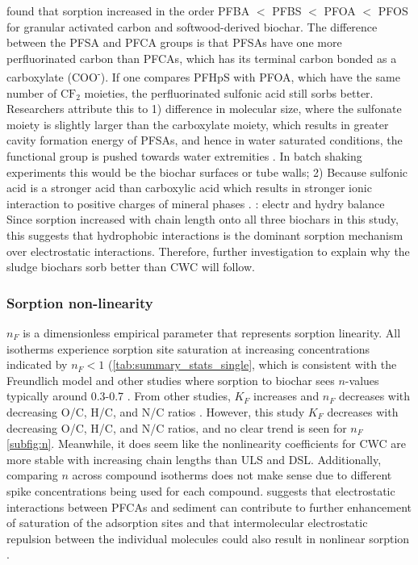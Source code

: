 \cite{zhang2021sorption} found that sorption increased in the order PFBA $<$ PFBS $<$ PFOA $<$ PFOS for granular activated carbon and softwood-derived biochar. The difference between the PFSA and PFCA groups is that PFSAs have one more perfluorinated carbon than PFCAs, which has its terminal carbon bonded as a carboxylate (COO\textsuperscript{-}). If one compares PFHpS with PFOA, which have the same number of $\mathrm{CF_2}$ moieties, the perfluorinated sulfonic acid still sorbs better. Researchers attribute this to 1) difference in molecular size, where the sulfonate moiety is slightly larger than the carboxylate moiety, which results in greater cavity formation energy of PFSAs, and hence in water saturated conditions, the functional group is pushed towards water extremities \citep{yin2022insights,sigmund2022sorption}. In batch shaking experiments this would be the biochar surfaces or tube walls; 2) Because sulfonic acid is a stronger acid than carboxylic acid which results in stronger ionic interaction to positive charges of mineral phases \citep{arvaniti2015review}. \cite{du2014adsorption}: electr and hydry balance Since sorption increased with chain length onto all three biochars in this study, this suggests that hydrophobic interactions is the dominant sorption mechanism over electrostatic interactions. Therefore, further investigation to explain why the sludge biochars sorb better than CWC will follow. 

\subsubsection{Sorption non-linearity}
$n_F$ is a dimensionless empirical parameter that represents sorption linearity. All isotherms experience sorption site saturation at increasing concentrations indicated by $n_F<1 $ (\cref{tab:summary_stats_single}, which is consistent with the Freundlich model and other studies where sorption to biochar sees $n$-values typically around 0.3-0.7 \citep{Cornelissen2005}. From other studies, $K_F$ increases and $n_F$ decreases with decreasing O/C, H/C, and N/C ratios \citep{Cornelissen2005}. However, this study $K_F$ decreases with decreasing O/C, H/C, and N/C ratios, and no clear trend is seen for $n_F$ \cref{subfig:n}. Meanwhile, it does seem like the nonlinearity coefficients for CWC are more stable with increasing chain lengths than ULS and DSL. Additionally, comparing $n$ across compound isotherms does not make sense due to different spike concentrations being used for each compound. \citep{yin2022insights} suggests that electrostatic interactions between PFCAs and sediment can contribute to further enhancement of saturation of the adsorption sites and that intermolecular electrostatic repulsion between the individual molecules could also result in nonlinear sorption \citep{higgins2006sorption,yin2022insights}.

